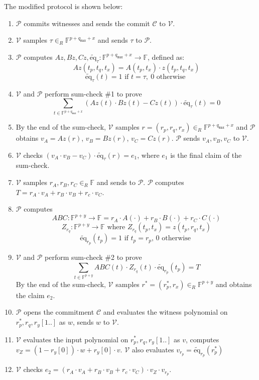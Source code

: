 \documentclass{article}
\newcommand{\qmax}{q_{\mathtt{max}}}
\renewcommand{\P}{\mathcal{P}}
\newcommand{\V}{\mathcal{V}}
\newcommand{\F}{\mathbb{F}}
\newcommand{\eq}{\widetilde{\mbox{eq}}}
\begin{document}
The modified protocol is shown below:
\begin{enumerate}
    \item $\P$ commits witnesses and sends the commit $\mathcal{C}$ to $\V$.
        \label{step:witness-commit}
    \item $\V$ samples $\tau\in_R\F^{p + \qmax + x}$ and sends $\tau$ to $\P$.
        \label{step:sample-tau}
    \item $\P$ computes $Az, Bz, Cz, \eq_\tau: \F^{p + \qmax + x} \to \F$, defined as:
        $$Az(t_p, t_q, t_x) = A(t_p, t_x) \cdot z(t_p, t_q, t_x)$$
        $$\eq_\tau(t) = 1\mbox{ if }t = \tau,\ 0\mbox{ otherwise }$$
        \label{step:mat-product}
    \item $\V$ and $\P$ perform sum-check \#1 to prove
        $$\displaystyle\sum_{t\in \F^{p + \qmax + x}}(Az(t)\cdot Bz(t) - Cz(t))\cdot \eq_\tau(t) = 0$$
        \label{step:sumcheck-1}
    \item By the end of the sum-check, $\V$ samples $r = (r_p, r_q, r_x)\in_R\F^{p + \qmax + x}$ and $\P$ obtains $v_A = Az(r)$, $v_B = Bz(r)$, $v_C = Cz(r)$. $\P$ sends $v_A, v_B, v_C$ to $\V$.
    \item $\V$ checks $(v_A\cdot v_B - v_C)\cdot \eq_\tau(r) = e_1$, where $e_1$ is the final claim of the sum-check.
        \label{step:sumcheck-1-verify}
    \item $\V$ samples $r_A, r_B, r_C\in_R\F$ and sends to $\P$. $\P$ computes $T = r_A\cdot v_A + r_B\cdot v_B + r_c\cdot v_C$.
    \item $\P$ computes 
        $$ABC: \F^{p + y} \to \F = r_A \cdot A(\cdot) + r_B \cdot B(\cdot) + r_C \cdot C(\cdot)$$
        $$Z_{r_q}: \F^{p + y}\to\F \mbox{ where } Z_{r_q}(t_p, t_x) = z(t_p, r_q, t_x)$$
        $$\eq_{r_p}(t_p) = 1 \mbox{ if } t_p = r_p\mbox{, 0 otherwise }$$
        \label{step:compute-z-poly}
    \item $\V$ and $\P$ perform sum-check \#2 to prove
        $$\displaystyle\sum_{t\in \F^{p + y}}ABC(t)\cdot Z_{r_q}(t)\cdot \eq_{r_p}(t_p) = T$$
        By the end of the sum-check, $\V$ samples $r^* = (r_p^*, r_x)\in_R\F^{p + y}$ and obtains the claim $e_2$.
        \label{step:sumcheck-2}
    \item $\P$ opens the commitment $\mathcal{C}$ and evaluates the witness polynomial on $r_p^*, r_q, r_y[1..]$ as $w$, sends $w$ to $\V$.
        \label{step:evaluate-witness}
    \item $\V$ evaluates the input polynomial on $r_p^*, r_q, r_y[1..]$ as $v$, computes $v_Z = (1 - r_y[0])\cdot w + r_y[0]\cdot v$. $\V$ also evaluates $v_{r_p} = \eq_{r_p}(r_p^*)$
        \label{step:evaluate-input}
    \item $\V$ checks $e_2 = (r_A\cdot v_A + r_B\cdot v_B + r_c\cdot v_C)\cdot v_Z \cdot v_{r_p}$.
\end{enumerate}
\end{document}
